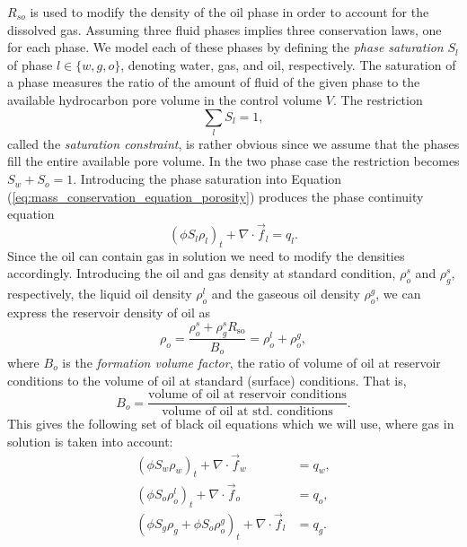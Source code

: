 $R_{so}$ is used to modify the density of the oil phase in order to account for the dissolved gas. Assuming three fluid phases implies three conservation laws, one for each phase. We model each of these phases by defining the \emph{phase saturation} $S_l$ of phase $l \in \{w,g,o\}$, denoting water, gas, and oil, respectively. The saturation of a phase measures the ratio of the amount of fluid of the given phase to the available hydrocarbon pore volume in the control volume $V$. The restriction 
\begin{equation} \label{eq:saturation_constraint}
\sum_l S_l = 1,
\end{equation} 
called the \emph{saturation constraint}, is rather obvious since we assume that the phases fill the entire available pore volume. In the two phase case the restriction becomes $S_w + S_o = 1$. Introducing the phase saturation into Equation (\ref{eq:mass_conservation_equation_porosity}) produces the phase continuity equation
\begin{equation} \label{eq:continuity_phase}
( \phi S_l \rho_l )_t + \nabla \cdot \vec{f}_l = q_l.
\end{equation}
Since the oil can contain gas in solution we need to modify the densities accordingly. Introducing the oil and gas density at standard condition, $\rho_{o}^{s}$ and $\rho_{g}^{s}$, respectively, the liquid oil density $\rho_{o}^{l}$ and the gaseous oil density $\rho_{o}^{g}$, we can express the reservoir density of oil as 
\begin{equation*}
\rho_o = \frac{\rho_o^s+\rho_g^s R_\text{so}}{B_o} = \rho_{o}^{l} + \rho_{o}^{g}, 
\end{equation*}
where $B_o$ is the \emph{formation volume factor}, the ratio of volume of oil at reservoir conditions to the volume of oil at standard (surface) conditions. That is,
\begin{equation*}
B_{o} = \frac{\text{volume of oil at reservoir conditions}}{\text{volume of oil at std. conditions}}. 
\end{equation*}
This gives the following set of black oil equations which we will use, where gas in solution is taken into account:
\begin{subequations}
\label{eq:black_oil_model}
\begin{align}
( \phi S_w \rho_w )_t + \nabla \cdot \vec{f}_w &= q_w, \\
( \phi S_o \rho_{o}^{l} )_t + \nabla \cdot \vec{f}_o &= q_o, \\
( \phi S_g \rho_g + \phi S_o \rho_{o}^{g} )_t + \nabla \cdot \vec{f}_l &= q_g.
\end{align}
\end{subequations}
